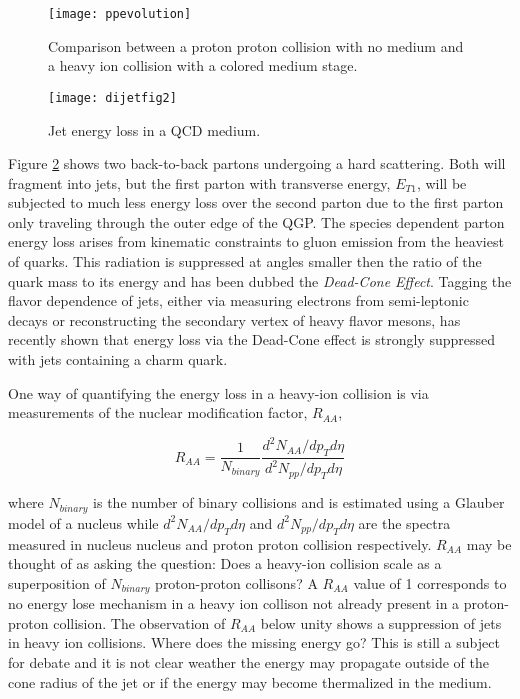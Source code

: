 \begin{figure}[h]
\texttt{[image: ppevolution]}
\centering
\caption{Comparison between a proton proton collision with no medium and a heavy ion collision with a colored medium stage\cite{PhysRevD.27.140}.}
\label{fig:HeavyIonCollisionvPP}
\end{figure}

\begin{figure}[h]
\texttt{[image: dijetfig2]}
\centering
\caption{Jet energy loss in a QCD medium\cite{Mohanty:2013yca}.}
\label{fig:JetEloss}
\end{figure}

Figure \ref{fig:JetEloss} shows two back-to-back partons undergoing a hard scattering.  Both will fragment into jets, but the first parton with transverse energy, $E_{T1}$, will be subjected to much less energy loss over the second parton due to the first parton only traveling through the outer edge of the QGP.  The species dependent parton energy loss arises from kinematic constraints to gluon emission from the heaviest of quarks.  This radiation is suppressed at angles smaller then the ratio of the quark mass to its energy and has been dubbed the \textit{Dead-Cone Effect}\cite{Thomas:2004ie}.  Tagging the flavor dependence of jets, either via measuring electrons from semi-leptonic decays or reconstructing the secondary vertex of heavy flavor mesons, has recently shown that energy loss via the Dead-Cone effect is strongly suppressed with jets containing a charm quark\cite{CAO2018255}.

One way of quantifying the energy loss in a heavy-ion collision is via measurements of the nuclear modification factor, $R_{AA}$,


\begin{equation}
R_{AA} = \frac{1}{N_{binary}} \frac{d^{2}N_{AA}/dp_{T}d\eta}{d^{2}N_{pp}/dp_{T}d\eta}
\label{eq:RAA}
\end{equation}

\noindent
where $N_{binary}$ is the number of binary collisions and is estimated using a Glauber model\cite{Miller:2007ri} of a nucleus while $d^{2}N_{AA}/dp_{T}d\eta$ and $d^{2}N_{pp}/dp_{T}d\eta$ are the spectra measured in nucleus nucleus and proton proton collision respectively.  $R_{AA}$ may be thought of as asking the question: Does a heavy-ion collision scale as a superposition of $N_{binary}$ proton-proton collisons?  A $R_{AA}$ value of 1 corresponds to no energy lose mechanism in a heavy ion collison not already present in a proton-proton collision.  The observation of $R_{AA}$ below unity shows a suppression of jets in heavy ion collisions.  Where does the missing energy go?  This is still a subject for debate and it is not clear weather the energy may propagate outside of the cone radius of the jet or if the energy may become thermalized in the medium.


